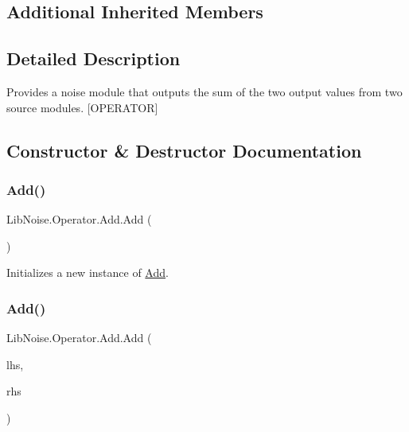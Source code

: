 \subsection*{Additional Inherited Members}


\subsection{Detailed Description}
Provides a noise module that outputs the sum of the two output values from two source modules. \mbox{[}O\+P\+E\+R\+A\+T\+OR\mbox{]} 



\subsection{Constructor \& Destructor Documentation}
\mbox{\label{class_lib_noise_1_1_operator_1_1_add_a001b9daf3ba1d3788af02bbea835d0d5}} 
\subsubsection{\texorpdfstring{Add()}{Add()}\hspace{0.1cm}{\footnotesize\ttfamily [1/2]}}
{\footnotesize\ttfamily Lib\+Noise.\+Operator.\+Add.\+Add (\begin{DoxyParamCaption}{ }\end{DoxyParamCaption})}



Initializes a new instance of \hyperlink{class_lib_noise_1_1_operator_1_1_add}{Add}. 

\mbox{\label{class_lib_noise_1_1_operator_1_1_add_a506cfb14045329aabff4a140e2160be6}} 
\subsubsection{\texorpdfstring{Add()}{Add()}\hspace{0.1cm}{\footnotesize\ttfamily [2/2]}}
{\footnotesize\ttfamily Lib\+Noise.\+Operator.\+Add.\+Add (\begin{DoxyParamCaption}\item[{\hyperlink{class_lib_noise_1_1_module_base}{Module\+Base}}]{lhs,  }\item[{\hyperlink{class_lib_noise_1_1_module_base}{Module\+Base}}]{rhs }\end{DoxyParamCaption})}



